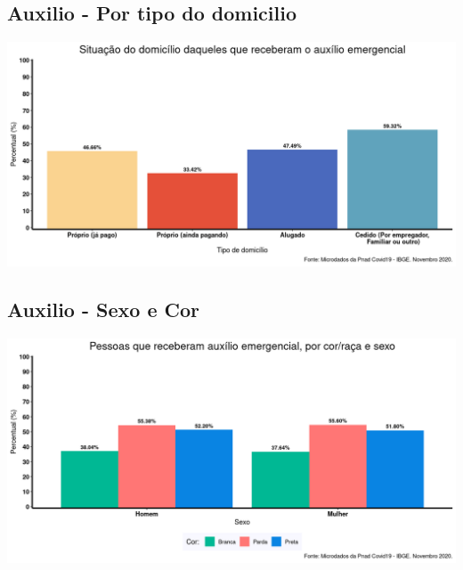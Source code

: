 \documentclass{SelfArx}
\begin{document}
\subsection*{Auxilio - Por tipo do domicilio}
\label{sec:org9810788}
\begin{center}
\includegraphics[width=.9\linewidth]{./figs/PNAD_COVID/auxilio_domicilio.png}
\end{center}
\subsection*{Auxilio - Sexo e Cor}
\label{sec:orgfe4b248}
\begin{center}
\includegraphics[width=.9\linewidth]{./figs/PNAD_COVID/auxilio_cor_sexo.png}
\end{center}
\end{document}
